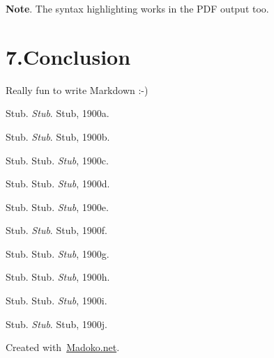 \documentclass[preprint]{{sigplanconf}}
\begin{document}
\noindent\textbf{Note}.
The syntax highlighting works in the PDF output too.%

\section{7.\hspace*{0.5em}Conclusion}\label{sec-conclusion}%

\noindent Really fun to write Markdown :-)%

{%
\begin{thebibliography}{10}%
\label{sec-bibliography}%

\mdbibitemlabel{}Stub.
\newblock  \emph{Stub}.
\newblock  Stub, 1900a.\label{clang}%

\mdbibitemlabel{}Stub.
\newblock  \emph{Stub}.
\newblock  Stub, 1900b.\label{forth}%

\mdbibitemlabel{}Stub.
\newblock  Stub.
\newblock  \emph{Stub}, 1900c.\label{liebniz}%

\mdbibitemlabel{}Stub.
\newblock  Stub.
\newblock  \emph{Stub}, 1900d.\label{lisp}%

\mdbibitemlabel{}Stub.
\newblock  Stub.
\newblock  \emph{Stub}, 1900e.\label{lua}%

\mdbibitemlabel{}Stub.
\newblock  \emph{Stub}.
\newblock  Stub, 1900f.\label{scheme}%

\mdbibitemlabel{}Stub.
\newblock  Stub.
\newblock  \emph{Stub}, 1900g.\label{self}%

\mdbibitemlabel{}Stub.
\newblock  Stub.
\newblock  \emph{Stub}, 1900h.\label{shapiro:effecttyping}%

\mdbibitemlabel{}Stub.
\newblock  Stub.
\newblock  \emph{Stub}, 1900i.\label{typescript}%

\mdbibitemlabel{}Stub.
\newblock  \emph{Stub}.
\newblock  Stub, 1900j.\label{unixshell}%
\par%
\end{thebibliography}}%

\begin{mdbmargintb}{4em}{}%
\begin{mdflushright}%
{\tiny Created with~\href{https://www.madoko.net}{Madoko.net}.}%
\end{mdflushright}%
\end{mdbmargintb}%
\end{document}
